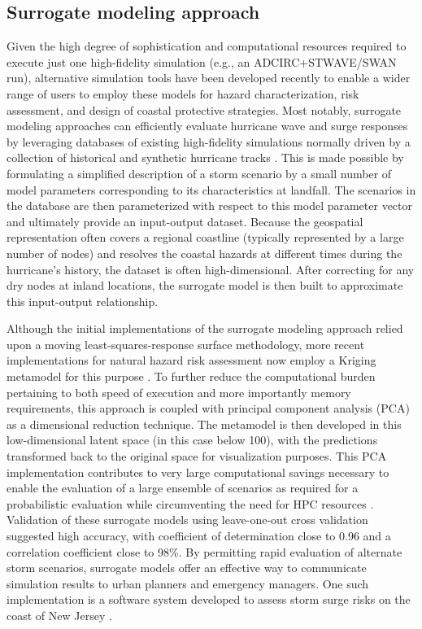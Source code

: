 \subsection{Surrogate modeling approach}

Given the high degree of sophistication and computational resources required to execute just one high-fidelity simulation (e.g., an ADCIRC+STWAVE/SWAN run), alternative simulation tools have been developed recently to enable a wider range of users to employ these models for hazard characterization, risk assessment, and design of coastal protective strategies. Most notably, surrogate modeling approaches can efficiently evaluate hurricane wave and surge responses by leveraging databases of existing high-fidelity simulations normally driven by a collection of historical and synthetic hurricane tracks \citep{usace2015north}. This is made possible by formulating a simplified description of a storm scenario by a small number of model parameters corresponding to its characteristics at landfall. The scenarios in the database are then parameterized with respect to this model parameter vector and ultimately provide an input-output dataset. Because the geospatial representation often covers a regional coastline (typically represented by a large number of nodes) and resolves the coastal hazards at different times during the hurricane's history, the dataset is often high-dimensional. After correcting for any dry nodes at inland locations, the surrogate model is then built to approximate this input-output relationship. 

Although the initial implementations of the surrogate modeling approach relied upon a moving least-squares-response surface methodology, more recent implementations for natural hazard risk assessment now employ a Kriging metamodel for this purpose \citep{jia2013kriging}. To further reduce the computational burden pertaining to both speed of execution and more importantly memory requirements, this approach is coupled with principal component analysis (PCA) as a dimensional reduction technique. The metamodel is then developed in this low-dimensional latent space (in this case below 100), with the predictions transformed back to the original space for visualization purposes. This PCA implementation contributes to very large computational savings necessary to enable the evaluation of a large ensemble of scenarios as required for a probabilistic evaluation while circumventing the need for HPC resources \citep{jia2013kriging}. Validation of these surrogate models using leave-one-out cross validation \citep{taflanidis2017advances} suggested high accuracy, with coefficient of determination close to 0.96 and a correlation coefficient close to 98\%. By permitting rapid evaluation of alternate storm scenarios, surrogate models offer an effective way to communicate simulation results to urban planners and emergency managers. One such implementation is a software system developed to assess storm surge risks on the coast of New Jersey \citep{njcoast2018implementation}.

